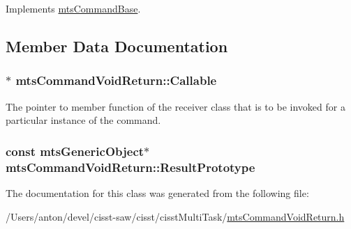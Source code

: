 Implements \hyperlink{classmts_command_base_a0885ce7a5321d7b672694ade780b9d64}{mts\+Command\+Base}.



\subsection{Member Data Documentation}
\hypertarget{classmts_command_void_return_a724dc0b6b5cc0a0fcc783aaa39e0ec8e}{}
\subsubsection[{Callable}]{$\ast$ mts\+Command\+Void\+Return\+::\+Callable\hspace{0.3cm}{\ttfamily [protected]}}\label{classmts_command_void_return_a724dc0b6b5cc0a0fcc783aaa39e0ec8e}
The pointer to member function of the receiver class that is to be invoked for a particular instance of the command. \hypertarget{classmts_command_void_return_aaf7b0c693d09cd4664f114b97200911d}{}
\subsubsection[{Result\+Prototype}]{\setlength{\rightskip}{0pt plus 5cm}const {\bf mts\+Generic\+Object}$\ast$ mts\+Command\+Void\+Return\+::\+Result\+Prototype\hspace{0.3cm}{\ttfamily [protected]}}\label{classmts_command_void_return_aaf7b0c693d09cd4664f114b97200911d}


The documentation for this class was generated from the following file\+:\begin{DoxyCompactItemize}
\item 
/\+Users/anton/devel/cisst-\/saw/cisst/cisst\+Multi\+Task/\hyperlink{mts_command_void_return_8h}{mts\+Command\+Void\+Return.\+h}\end{DoxyCompactItemize}
